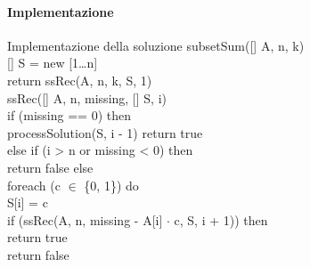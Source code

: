 \paragraph{Implementazione}
\begin{minicode}{Implementazione della soluzione}
\ind{} subsetSum([] A,  n,  k)\\
    [] S = new [1\dots n]\\
    return ssRec(A, n, k, S, 1)\\

\ind{} ssRec([] A,  n,  missing, [] S,  i)\\
    \indf if (missing == 0) then\\
        processSolution(S, i - 1)\hfill{}
        return true\\
    \indf else if (i > n or missing < 0) then\\
        return false\hfill{}
    \indf else\\
        \indff foreach (c $\in$ \{0, 1\}) do\\
            S[i] = c\\
            \indfff if (ssRec(A, n, missing - A[i] $\cdot$ c, S, i + 1)) then\\
                return true\\
        \indff return false
\end{minicode}